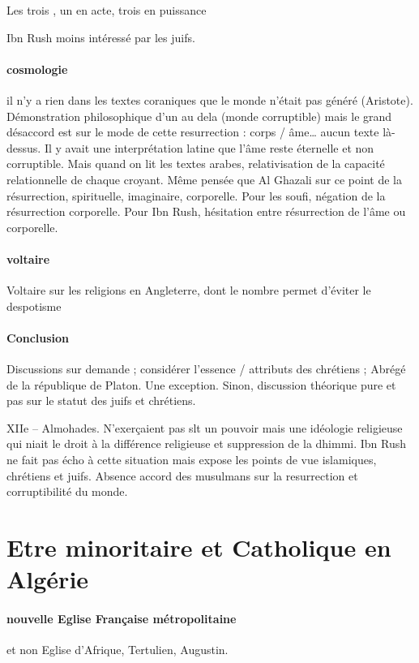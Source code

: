 Les trois , un en acte, trois en puissance

Ibn Rush moins intéressé par les juifs. 

\paragraph{cosmologie} il n’y a rien dans les textes coraniques que le monde n’était pas généré (Aristote). Démonstration philosophique d’un au dela (monde corruptible) mais le grand désaccord est sur le mode de cette resurrection : corps / âme… aucun texte là-dessus. Il y avait une interprétation latine que l’âme reste éternelle et non corruptible. Mais quand on lit les textes arabes, relativisation de la capacité relationnelle de chaque croyant. Même pensée que Al Ghazali sur ce point de la résurrection, spirituelle, imaginaire, corporelle. Pour les soufi, négation de la résurrection corporelle. Pour Ibn Rush, hésitation entre résurrection de l’âme ou corporelle.  
\paragraph{voltaire}
Voltaire sur les religions en Angleterre, dont le nombre permet d’éviter le despotisme

\paragraph{Conclusion} Discussions sur demande ; considérer l’essence / attributs des chrétiens ; 
Abrégé de la république de Platon. Une exception. Sinon, discussion théorique pure et pas sur le statut des juifs et chrétiens. 

 
\begin{Synthesis}
XIIe – Almohades. N’exerçaient pas slt un pouvoir mais une idéologie religieuse qui niait le droit à la différence religieuse et suppression de la dhimmi.
Ibn Rush ne fait pas écho à cette situation mais expose les points de vue islamiques, chrétiens et juifs.
Absence accord des musulmans sur la resurrection et corruptibilité du monde. 
\end{Synthesis}
\section{Etre minoritaire et Catholique en Algérie}
\paragraph{nouvelle Eglise Française métropolitaine} et non Eglise d’Afrique, Tertulien, Augustin. 
